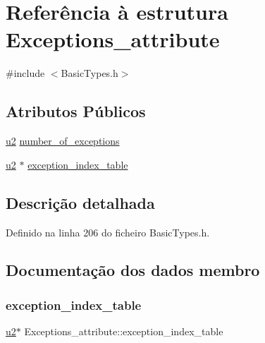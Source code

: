 \hypertarget{structExceptions__attribute}{}\section{Referência à estrutura Exceptions\+\_\+attribute}
\label{structExceptions__attribute}


{\ttfamily \#include $<$Basic\+Types.\+h$>$}

\subsection*{Atributos Públicos}
\begin{DoxyCompactItemize}
\item 
\hyperlink{BasicTypes_8h_a732cde1300aafb73b0ea6c2558a7a54f}{u2} \hyperlink{structExceptions__attribute_af9f38fbc43eadcb56658f90e8743c90b}{number\+\_\+of\+\_\+exceptions}
\item 
\hyperlink{BasicTypes_8h_a732cde1300aafb73b0ea6c2558a7a54f}{u2} $\ast$ \hyperlink{structExceptions__attribute_a85a01c4ef477cf86cd0dc099eee2b08d}{exception\+\_\+index\+\_\+table}
\end{DoxyCompactItemize}


\subsection{Descrição detalhada}


Definido na linha 206 do ficheiro Basic\+Types.\+h.



\subsection{Documentação dos dados membro}
\mbox{\label{structExceptions__attribute_a85a01c4ef477cf86cd0dc099eee2b08d}} 
\subsubsection{\texorpdfstring{exception\+\_\+index\+\_\+table}{exception\_index\_table}}
{\footnotesize\ttfamily \hyperlink{BasicTypes_8h_a732cde1300aafb73b0ea6c2558a7a54f}{u2}$\ast$ Exceptions\+\_\+attribute\+::exception\+\_\+index\+\_\+table}



